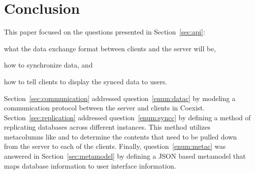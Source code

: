 
\section{Conclusion} \label{sec:conclusion}








This paper focused on the questions presented in Section~\ref{sec:api}:
\begin{inparaenum}
\item\label{enum:datac} what the data exchange format between clients and the server will be, 
\item\label{enum:syncc} how to synchronize data, and
\item\label{enum:metac} how to tell clients to display the synced data to users. 
\end{inparaenum}
Section~\ref{sec:communication} addressed question~\ref{enum:datac} by modeling a
communication protocol between the server and clients in Coexist.
Section~\ref{sec:replication} addressed question~\ref{enum:syncc} by defining a
method of replicating databases across different instances. This method utilizes
metacolumns like  and  to determine the contents that
need to be pulled down from the server to each of the clients. Finally,
question~\ref{enum:metac} was answered in Section~\ref{sec:metamodel} by
defining a JSON based metamodel that maps database information to user interface
information.


